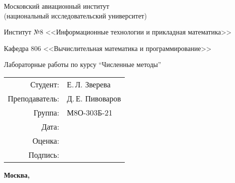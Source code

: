 \begin{titlepage}
\begin{center}
\bfseries

{\Large Московский авиационный институт\\ (национальный исследовательский университет)

}

\vspace{48pt}

{\large Институт №8 <<Информационные технологии и прикладная математика>>
}

\vspace{36pt}

{\large Кафедра 806 <<Вычислительная математика и программирование>>

}


\vspace{48pt}

Лабораторные работы по курсу \enquote{Численные методы}

\end{center}

\vspace{72pt}

\begin{flushright}
\begin{tabular}{rl}
Студент: & Е.\,Л. Зверева \\
Преподаватель: & Д.\,Е. Пивоваров \\
Группа: & М8О-303Б-21 \\
Дата: & \\
Оценка: & \\
Подпись: & \\
\end{tabular}
\end{flushright}

\vfill

\begin{center}
\bfseries
Москва, \the\year
\end{center}
\end{titlepage}

\pagebreak
